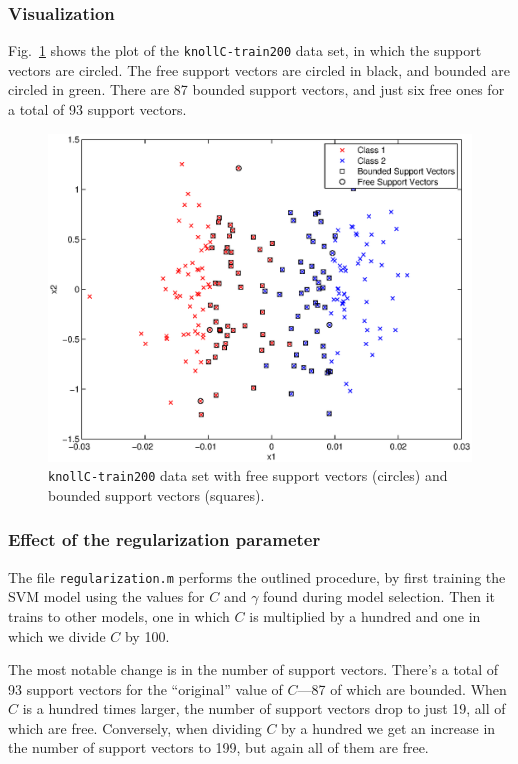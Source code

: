 \documentclass{article}
\begin{document}
\subsubsection{Visualization}

Fig.~\ref{fig:freebounded} shows the plot of the \texttt{knollC-train200} data set, in which the support vectors are circled. The free support vectors are circled in black, and bounded are circled in green. There are 87 bounded support vectors, and just six free ones for a total of 93 support vectors.

\begin{figure}[!ht]
  \centering
  \includegraphics[width=.8\textwidth]{Code/freeBoundedSVs.eps}
  \caption{\texttt{knollC-train200} data set with free support vectors (circles) and bounded support vectors (squares).}
  \label{fig:freebounded}
\end{figure}

\subsubsection{Effect of the regularization parameter}


The file \texttt{regularization.m} performs the outlined procedure, by first training the SVM model using the values for $C$ and $\gamma$ found during model selection. Then it trains to other models, one in which $C$ is multiplied by a hundred and one in which we divide $C$ by 100.

The most notable change is in the number of support vectors. There's a total of 93 support vectors for the ``original'' value of $C$---87 of which are bounded. When $C$ is a hundred times larger, the number of support vectors drop to just 19, all of which are free. Conversely, when dividing $C$ by a hundred we get an increase in the number of support vectors to 199, but again all of them are free.
\end{document}
